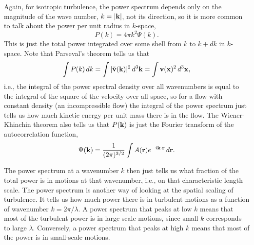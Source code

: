 Again, for isotropic turbulence, the power spectrum depends only on the magnitude of the wave number, $k=|\mathbf{k}|$, not its direction, so it is more common to talk about the power per unit radius in $k$-space,
\begin{equation}
P(k) = 4\pi k^2 \Psi(k).
\end{equation}
This is just the total power integrated over some shell from $k$ to $k+dk$ in $k$-space. Note that Parseval's theorem tells us that
\begin{equation}
\int P(k)\, dk = \int | \tilde{\mathbf{v}}(\mathbf{k})|^2 \, d^3\mathbf{k} = \int \mathbf{v}(\mathbf{x})^2 \, d^3\mathbf{x},
\end{equation}
i.e., the integral of the power spectral density over all wavenumbers is equal to the integral of the square of the velocity over all space, so for a flow with constant density (an incompressible flow) the integral of the power spectrum just tells us how much kinetic energy per unit mass there is in the flow. The Wiener-Khinchin theorem also tells us that $P(\mathbf{k})$ is just the Fourier transform of the autocorrelation function,
\begin{equation}
\Psi(\mathbf{k}) = \frac{1}{(2\pi)^{3/2}} \int A(\mathbf{r}) e^{-i\mathbf{k}\cdot\mathbf{r}} \,d\mathbf{r}.
\end{equation}

The power spectrum at a wavenumber $k$ then just tells us what fraction of the total power is in motions at that wavenumber, i.e., on that characteristic length scale. The power spectrum is another way of looking at the spatial scaling of turbulence. It tells us how much power there is in turbulent motions as a function of wavenumber $k=2\pi/\lambda$. A power spectrum that peaks at low $k$ means that most of the turbulent power is in large-scale motions, since small $k$ corresponds to large $\lambda$. Conversely, a power spectrum that peaks at high $k$ means that most of the power is in small-scale motions.

